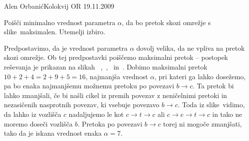 \begin{naloga}{Alen Orbanić}{Kolokvij OR 19.11.2009}
\begin{vprasanje}
Poišči minimalno vrednost parametra $\alpha$,
da bo pretok skozi omrežje s slike~\fig maksimalen.
Utemelji izbiro.

\begin{slika}
\pgfslika
{}
\end{slika}
\end{vprasanje}

\begin{odgovor}
Predpostavimo, da je vrednost parametra $\alpha$ dovolj velika,
da ne vpliva na pretok skozi omrežje.
Ob tej predpostavki poiščemo maksimalni pretok
-- postopek reševanja je prikazan na slikah~%
,~,~%
 in~.
Dobimo maksimalni pretok $10+2+4 = 2+9+5 = 16$,
najmanjša vrednost $\alpha$, pri kateri ga lahko dosežemo,
pa bo enaka najmanjšemu možnemu pretoku po povezavi $b \to c$.
Ta pretok bi lahko zmanjšali,
če bi našli cikel iz premih povezav z neničelnimi pretoki
in nezasičenih nasprotnih povezav,
ki vsebuje povezavo $b \to c$.
Toda iz slike~ vidimo,
da lahko iz vozlišča $c$
nadaljujemo le kot $c \to t \to c$ ali $c \to e \to t \to c$
in tako ne moremo doseči vozlišča $b$.
Pretoka po povezavi $b \to c$ torej ni mogoče zmanjšati,
tako da je iskana vrednost enaka $\alpha = 7$.

\begin{slika}
\end{slika}
\begin{slika}
\end{slika}
\begin{slika}
\end{slika}
\begin{slika}
\end{slika}
\end{odgovor}
\end{naloga}
